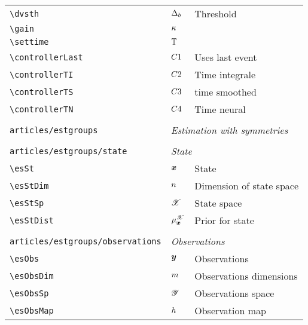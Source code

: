 \begin{longtable}{lll}
 {\color[rgb]{0.5,0.5,0.5}\texttt{\textbackslash dvsth}} & ${\Delta_{b}}$ &  Threshold\\ 
 {\color[rgb]{0.5,0.5,0.5}\texttt{\textbackslash gain}} & $\kappa$ & \\ 
 {\color[rgb]{0.5,0.5,0.5}\texttt{\textbackslash settime}} & $\mathbb{T}$ & \\ 
 {\color[rgb]{0.5,0.5,0.5}\texttt{\textbackslash controllerLast}} & $C1$ &  Uses last event\\ 
 {\color[rgb]{0.5,0.5,0.5}\texttt{\textbackslash controllerTI}} & $C2$ &  Time integrale\\ 
 {\color[rgb]{0.5,0.5,0.5}\texttt{\textbackslash controllerTS}} & $C3$ &  time smoothed\\ 
 {\color[rgb]{0.5,0.5,0.5}\texttt{\textbackslash controllerTN}} & $C4$ &  Time neural\\ 
  &  & \\ 
 {\color[rgb]{0.5,0.5,0.5}\texttt{articles/estgroups}} & \multicolumn{2}{l}{\emph{Estimation with symmetries}}\\ 
 \hline
 &  & \\ 
 {\color[rgb]{0.5,0.5,0.5}\texttt{articles/estgroups/state}} & \multicolumn{2}{l}{\emph{State}}\\ 
 \hline
{\color[rgb]{0.5,0.5,0.5}\texttt{\textbackslash esSt}} & $\boldsymbol{x}$ &  State\\ 
 {\color[rgb]{0.5,0.5,0.5}\texttt{\textbackslash esStDim}} & $n$ &  Dimension of state space\\ 
 {\color[rgb]{0.5,0.5,0.5}\texttt{\textbackslash esStSp}} & $\mathscr{X}$ &  State space\\ 
 {\color[rgb]{0.5,0.5,0.5}\texttt{\textbackslash esStDist}} & $\mu^{\mathscr{X}}_{\boldsymbol{x}}$ &  Prior for state\\ 
  &  & \\ 
 {\color[rgb]{0.5,0.5,0.5}\texttt{articles/estgroups/observations}} & \multicolumn{2}{l}{\emph{Observations}}\\ 
 \hline
{\color[rgb]{0.5,0.5,0.5}\texttt{\textbackslash esObs}} & $\boldsymbol{y}$ &  Observations\\ 
 {\color[rgb]{0.5,0.5,0.5}\texttt{\textbackslash esObsDim}} & $m$ &  Observations dimensions\\ 
 {\color[rgb]{0.5,0.5,0.5}\texttt{\textbackslash esObsSp}} & $\mathscr{Y}$ &  Observations space\\ 
 {\color[rgb]{0.5,0.5,0.5}\texttt{\textbackslash esObsMap}} & $h$ &  Observation map\\ 

\end{longtable}
